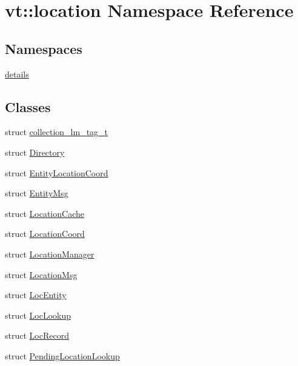 \hypertarget{namespacevt_1_1location}{}\section{vt\+:\+:location Namespace Reference}
\label{namespacevt_1_1location}
\subsection*{Namespaces}
\begin{DoxyCompactItemize}
\item 
 \hyperlink{namespacevt_1_1location_1_1details}{details}
\end{DoxyCompactItemize}
\subsection*{Classes}
\begin{DoxyCompactItemize}
\item 
struct \hyperlink{structvt_1_1location_1_1collection__lm__tag__t}{collection\+\_\+lm\+\_\+tag\+\_\+t}
\item 
struct \hyperlink{structvt_1_1location_1_1_directory}{Directory}
\item 
struct \hyperlink{structvt_1_1location_1_1_entity_location_coord}{Entity\+Location\+Coord}
\item 
struct \hyperlink{structvt_1_1location_1_1_entity_msg}{Entity\+Msg}
\item 
struct \hyperlink{structvt_1_1location_1_1_location_cache}{Location\+Cache}
\item 
struct \hyperlink{structvt_1_1location_1_1_location_coord}{Location\+Coord}
\item 
struct \hyperlink{structvt_1_1location_1_1_location_manager}{Location\+Manager}
\item 
struct \hyperlink{structvt_1_1location_1_1_location_msg}{Location\+Msg}
\item 
struct \hyperlink{structvt_1_1location_1_1_loc_entity}{Loc\+Entity}
\item 
struct \hyperlink{structvt_1_1location_1_1_loc_lookup}{Loc\+Lookup}
\item 
struct \hyperlink{structvt_1_1location_1_1_loc_record}{Loc\+Record}
\item 
struct \hyperlink{structvt_1_1location_1_1_pending_location_lookup}{Pending\+Location\+Lookup}
\end{DoxyCompactItemize}
